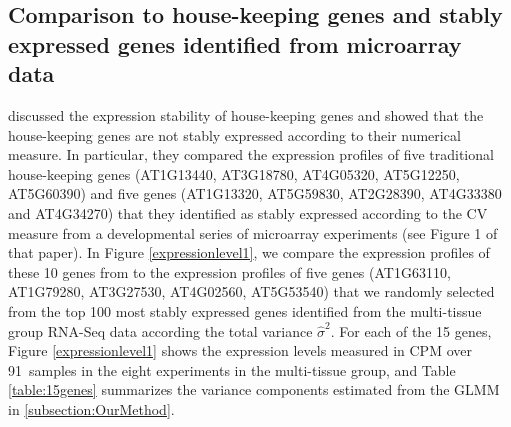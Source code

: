 \documentclass[letterpaper,12pt]{article}
\newcommand{\howmanytissuesample}{91~}
\newcommand{\SelectFiveGene}{AT1G63110, AT1G79280, AT3G27530, AT4G02560, AT5G53540}
\begin{document}


\subsection{Comparison to house-keeping genes and stably expressed genes
identified from microarray data}\label{section:CompareStablyExpressedGene}
\cite{czechowski2005genome} discussed the expression stability of
house-keeping genes and showed that the house-keeping genes are not stably
expressed according to their numerical measure. In particular, they compared
the expression profiles of five traditional house-keeping genes (AT1G13440,
AT3G18780, AT4G05320, AT5G12250, AT5G60390) and five genes (AT1G13320,
AT5G59830, AT2G28390, AT4G33380 and AT4G34270) that they identified  as stably
expressed according to the CV measure from a developmental series of
microarray experiments (see Figure 1 of that paper).  
In Figure \ref{expressionlevel1}, we compare the expression profiles 
of these 10 genes from \cite{czechowski2005genome} to the expression profiles
of five genes (\SelectFiveGene) that we
randomly selected from the top 100 most stably expressed genes identified from
the multi-tissue group RNA-Seq data according the total variance $\hat\sigma^2$.
For each of the 15 genes, Figure \ref{expressionlevel1} shows the expression levels measured
in CPM over \howmanytissuesample samples in the eight experiments in the multi-tissue group,
and Table \ref{table:15genes} summarizes the variance components estimated from the
GLMM in \ref{subsection:OurMethod}. 
\end{document}
